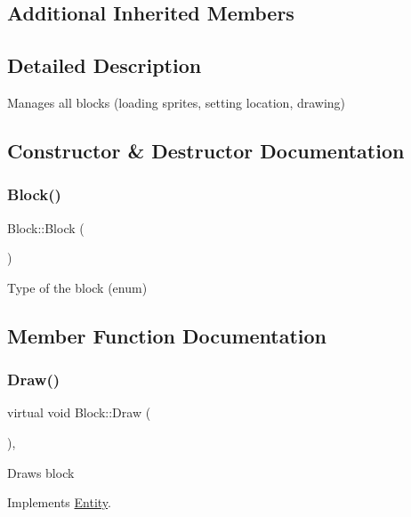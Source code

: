 \subsection*{Additional Inherited Members}


\subsection{Detailed Description}
Manages all blocks (loading sprites, setting location, drawing) 

\subsection{Constructor \& Destructor Documentation}
\mbox{\label{class_block_ad5589c616b24a615a8eb3ca11c2faa75}} 
\subsubsection{\texorpdfstring{Block()}{Block()}}
{\footnotesize\ttfamily Block\+::\+Block (\begin{DoxyParamCaption}\item[{Block\+Type}]{ }\end{DoxyParamCaption})\hspace{0.3cm}{\ttfamily [explicit]}}

Type of the block (enum) 

\subsection{Member Function Documentation}
\mbox{\label{class_block_a6d49bcccea386310e034cddb0bab4620}} 
\subsubsection{\texorpdfstring{Draw()}{Draw()}}
{\footnotesize\ttfamily virtual void Block\+::\+Draw (\begin{DoxyParamCaption}{ }\end{DoxyParamCaption})\hspace{0.3cm}{\ttfamily [override]}, {\ttfamily [virtual]}}

Draws block 

Implements \mbox{\hyperlink{class_entity_a1d006ae3028ba4ddfc9b4f202ccddf55}{Entity}}.


